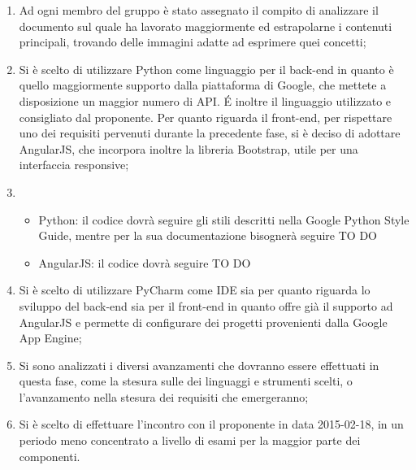 	\begin{enumerate}
		\item Ad ogni membro del gruppo è stato assegnato il compito di analizzare il documento sul quale ha lavorato maggiormente ed estrapolarne i contenuti principali, trovando delle immagini adatte ad esprimere quei concetti;
		\item Si è scelto di utilizzare Python come linguaggio per il back-end in quanto è quello maggiormente supporto dalla piattaforma di Google, che mettete a disposizione un maggior numero di API. \'E inoltre il linguaggio utilizzato e consigliato dal proponente. \newline
		Per quanto riguarda il front-end, per rispettare uno dei requisiti pervenuti durante la precedente fase, si è deciso di adottare AngularJS, che incorpora inoltre la libreria Bootstrap, utile per una interfaccia responsive;
		\item 
			\begin{itemize}
				\item Python: il codice dovrà seguire gli stili descritti nella Google Python Style Guide, mentre per la sua documentazione bisognerà seguire TO DO 
				\item AngularJS: il codice dovrà seguire TO DO
			\end{itemize}
		\item Si è scelto di utilizzare PyCharm come IDE sia per quanto riguarda lo sviluppo del back-end sia per il front-end in quanto offre già il supporto ad AngularJS e permette di configurare dei progetti provenienti dalla Google App Engine;
		\item Si sono analizzati i diversi avanzamenti che dovranno essere effettuati in questa fase, come la stesura sulle \docNameVersionNdP{} dei linguaggi e strumenti scelti, o l'avanzamento nella stesura dei requisiti che emergeranno;
		\item Si è scelto di effettuare l'incontro con il proponente in data 2015-02-18, in un periodo meno concentrato a livello di esami per la maggior parte dei componenti.
	\end{enumerate}
